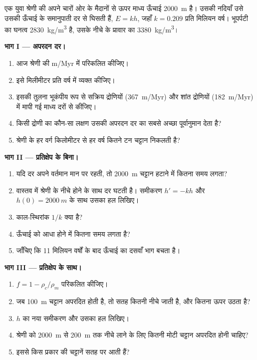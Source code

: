 \begin{problem}
\label{pb:g12:destruction-of-mountains:1}
एक युवा श्रेणी की अपने चारों ओर के मैदानों से ऊपर माध्य ऊँचाई \qty{2000}{m} है।
उसकी नदियाँ उसे उसकी ऊँचाई के समानुपाती दर से घिसती हैं, $E = kh$,
जहाँ $k = 0.209$ प्रति मिलियन वर्ष। भूपर्पटी का घनत्व
\qty{2830}{kg/m^3} है, उसके नीचे के प्रावार का \qty{3380}{kg/m^3}।

\medskip
\noindent\textbf{भाग I --- अपरदन दर।}
\begin{enumerate}
  \item आज श्रेणी की  \unit{m/Myr} में परिकलित कीजिए।
  \item इसे मिलीमीटर प्रति वर्ष में व्यक्त कीजिए।
  \item इसकी तुलना भूकंपीय रूप से सक्रिय द्रोणियों
        (\qty{367}{m/Myr}) और शांत द्रोणियों (\qty{182}{m/Myr}) में मापी गई माध्य दरों से कीजिए।
  \item किसी द्रोणी का कौन-सा लक्षण उसकी अपरदन दर का सबसे अच्छा पूर्वानुमान देता है?
  \item श्रेणी के हर वर्ग किलोमीटर से हर वर्ष कितने टन चट्टान
        निकलती है?
\end{enumerate}

\medskip
\noindent\textbf{भाग II --- प्रतिक्षेप के बिना।}
\begin{enumerate}[resume]
  \item यदि दर अपने वर्तमान मान पर रहती, तो \qty{2000}{m} चट्टान हटाने में
        कितना समय लगता?
  \item वास्तव में श्रेणी के नीचे होने के साथ दर घटती है। समीकरण
        $h' = -kh$ और $h(0) = \qty{2000}{m}$ के साथ उसका हल लिखिए।
  \item काल-स्थिरांक $1/k$ क्या है?
  \item ऊँचाई को आधा होने में कितना समय लगता है?
  \item जाँचिए कि 11 मिलियन वर्षों के बाद ऊँचाई का दसवाँ भाग बचता है।
\end{enumerate}

\medskip
\noindent\textbf{भाग III --- प्रतिक्षेप के साथ।}
\begin{enumerate}[resume]
  \item $f = 1 - \rho_c/\rho_m$ परिकलित कीजिए।
  \item जब \qty{100}{m} चट्टान अपरदित होती है, तो सतह कितनी नीचे
        जाती है, और  कितना ऊपर उठता है?
  \item $h$ का नया समीकरण और उसका हल लिखिए।
  \item श्रेणी को \qty{2000}{m} से \qty{200}{m} तक नीचे लाने के लिए
        कितनी मोटी चट्टान अपरदित होनी चाहिए?
  \item इससे किस प्रकार की चट्टानें सतह पर आती हैं?
\end{enumerate}


\end{problem}
